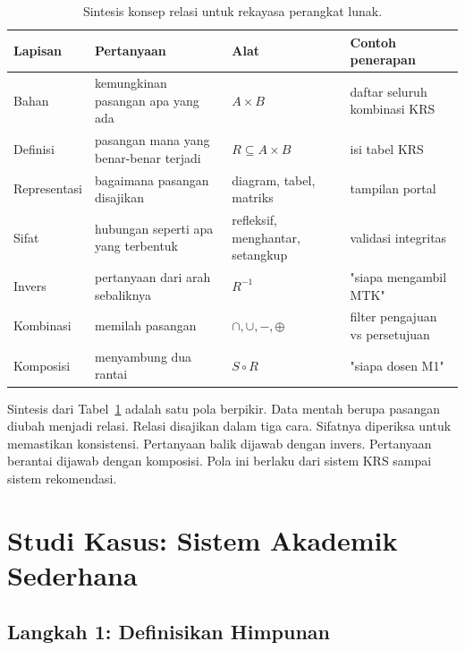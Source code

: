 \documentclass[11pt,a4paper]{article}
\begin{document}
\begin{table}[H]
	\centering
	\caption{Sintesis konsep relasi untuk rekayasa perangkat lunak.}
	\label{tab:sintesis}
	\footnotesize
	\begin{tabularx}{\textwidth}{l X X X}
		\toprule
		Lapisan      & Pertanyaan                             & Alat                             & Contoh penerapan                \\
		\midrule
		Bahan        & kemungkinan pasangan apa yang ada      & $A \times B$                     & daftar seluruh kombinasi KRS    \\
		Definisi     & pasangan mana yang benar-benar terjadi & $R \subseteq A \times B$         & isi tabel KRS                   \\
		Representasi & bagaimana pasangan disajikan           & diagram, tabel, matriks          & tampilan portal                 \\
		Sifat        & hubungan seperti apa yang terbentuk    & refleksif, menghantar, setangkup & validasi integritas             \\
		Invers       & pertanyaan dari arah sebaliknya        & $R^{-1}$                         & "siapa mengambil MTK"           \\
		Kombinasi    & memilah pasangan                       & $\cap, \cup, -, \oplus$          & filter pengajuan vs persetujuan \\
		Komposisi    & menyambung dua rantai                  & $S \circ R$                      & "siapa dosen M1"                \\
		\bottomrule
	\end{tabularx}
\end{table}

Sintesis dari Tabel~\ref{tab:sintesis} adalah satu pola berpikir. Data mentah berupa pasangan diubah menjadi relasi. Relasi disajikan dalam tiga cara. Sifatnya diperiksa untuk memastikan konsistensi. Pertanyaan balik dijawab dengan invers. Pertanyaan berantai dijawab dengan komposisi. Pola ini berlaku dari sistem KRS sampai sistem rekomendasi.

\section{Studi Kasus: Sistem Akademik Sederhana}

\subsection{Langkah 1: Definisikan Himpunan}
\end{document}
